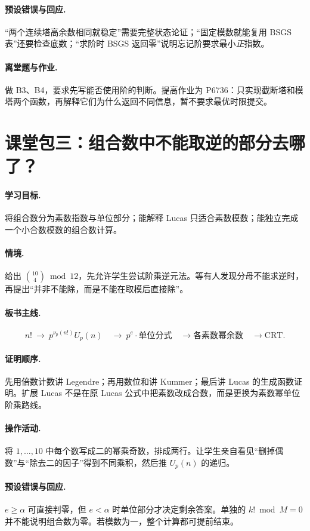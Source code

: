 \documentclass[UTF8,a4paper,11pt,twoside,openright,fontset=fandol]{ctexbook}
\theoremstyle{definition}
\begin{document}
\paragraph{预设错误与回应.} “两个连续塔高余数相同就稳定”需要完整状态论证；“固定模数就能复用 BSGS 表”还要检查底数；“求阶时 BSGS 返回零”说明忘记阶要求最小\emph{正}指数。
\paragraph{离堂题与作业.} 做 B3、B4，要求先写能否使用阶的判断。提高作业为 P6736：只实现截断塔和模塔两个函数，再解释它们为什么返回不同信息，暂不要求最优时限提交。

\section{课堂包三：组合数中不能取逆的部分去哪了？}
\paragraph{学习目标.} 将组合数分为素数指数与单位部分；能解释 Lucas 只适合素数模数；能独立完成一个小合数模数的组合数计算。
\paragraph{情境.} 给出 $\binom{10}{4}\bmod12$，先允许学生尝试阶乘逆元法。等有人发现分母不能求逆时，再提出“并非不能除，而是不能在取模后直接除”。
\paragraph{板书主线.}
\[
 n!\ \longrightarrow\ p^{\nu_p(n!)}U_p(n)
 \quad\longrightarrow\ p^e\cdot\text{单位分式}
 \quad\longrightarrow\text{各素数幂余数}\quad\longrightarrow\mathrm{CRT}.
\]
\paragraph{证明顺序.} 先用倍数计数讲 Legendre；再用数位和讲 Kummer；最后讲 Lucas 的生成函数证明。扩展 Lucas 不是在原 Lucas 公式中把素数改成合数，而是更换为素数幂单位阶乘路线。
\paragraph{操作活动.} 将 $1,\ldots,10$ 中每个数写成二的幂乘奇数，排成两行。让学生亲自看见“删掉偶数”与“除去二的因子”得到不同乘积，然后推 $U_p(n)$ 的递归。
\paragraph{预设错误与回应.} $e\ge\alpha$ 可直接判零，但 $e<\alpha$ 时单位部分才决定剩余答案。单独的 $k!\bmod M=0$ 并不能说明组合数为零。若模数为一，整个计算都可提前结束。
\end{document}
